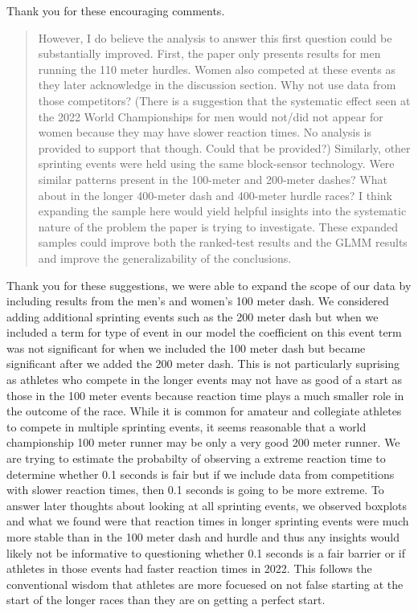 \documentclass[12pt]{article}
\newenvironment{comment}%
{\begin{quotation}\noindent\small\it\color{darkblue}\ignorespaces%
}{\end{quotation}}
\begin{document}
Thank you for these encouraging comments.  


\begin{comment}
However, I do believe the analysis to answer this first question could be
substantially improved. First, the paper only presents results for men running
the 110 meter hurdles. Women also competed at these events as they later
acknowledge in the discussion section. Why not use data from those competitors?
(There is a suggestion that the systematic effect seen at the 2022 World
Championships for men would not/did not appear for women because they may have
slower reaction times. No analysis is provided to support that though. Could
that be provided?) Similarly, other sprinting events were held using the same
block-sensor technology. Were similar patterns present in the 100-meter and
200-meter dashes? What about in the longer 400-meter dash and 400-meter hurdle
races? I think expanding the sample here would yield helpful insights into the
systematic nature of the problem the paper is trying to investigate. These
expanded samples could improve both the ranked-test results and the GLMM results
and improve the generalizability of the conclusions.
\end{comment}


Thank you for these suggestions, we were able to expand the scope of our data
by including results from the men's and women's 100 meter dash.  We considered
adding additional sprinting events such as the 200 meter dash but
when we included a term for type of event in our model the coefficient on this
event term was not significant for when we included the 100 meter dash
but became significant after we added the 200 meter dash.
This is not particularly suprising as athletes who compete in the longer
events may not have as good of a start as those in the 100
meter events because reaction time plays a much smaller role in the outcome of
the race. While it is common for amateur and collegiate athletes to compete in
multiple sprinting events, it seems reasonable that a world championship 100
meter runner may be only a very good 200 meter runner.  We are trying to
estimate the probabilty of observing a extreme reaction time to determine
whether 0.1 seconds is fair but if we include data from competitions with slower
reaction times, then 0.1 seconds is going to be more extreme.  To answer later
thoughts about looking at all sprinting events, we observed boxplots and what we
found were that reaction times in longer sprinting events were much more stable
than in the 100 meter dash and hurdle and thus any insights would likely not be
informative to questioning whether 0.1 seconds is a fair barrier or if athletes
in those events had faster reaction times in 2022.  This follows the conventional
wisdom that athletes are more focuesed on not false starting at the start of the
longer races than they are on getting a perfect start.
\end{document}
